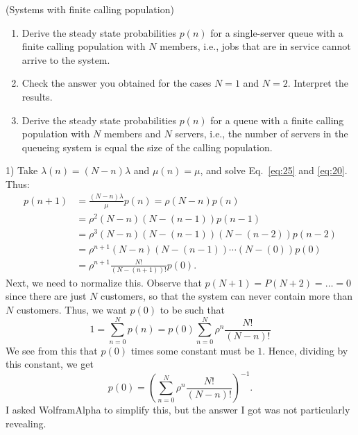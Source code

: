 \begin{question}(Systems with finite calling population)
  \begin{enumerate}
  \item Derive the steady state probabilities $p(n)$ for a
    single-server queue with a finite calling population with $N$
    members, i.e., jobs that are in service cannot arrive to the system.
  \item Check the answer you obtained for the cases $N=1$ and
    $N=2$. Interpret the results.
  \item Derive the steady state probabilities $p(n)$ for a queue with
    a finite calling population with $N$ members and $N$ servers,
    i.e., the number of servers in the queueing system is equal the
    size of the calling population.
  \end{enumerate}
  
    \begin{solution}
1) Take $\lambda(n) = (N-n)\lambda$ and $\mu(n) = \mu$, and solve
    Eq.~\eqref{eq:25} and \eqref{eq:20}.  Thus: 
    \begin{equation*}
      \begin{split}
       p(n+1) 
& = \frac{(N-n)\lambda}\mu p(n) 
 = \rho (N-n) p(n) \\
& = \rho^2 (N-n)(N-(n-1))p(n-1) \\
& = \rho^3 (N-n)(N-(n-1))(N-(n-2)) p(n-2) \\
& = \rho^{n+1} (N-n)(N-(n-1))\cdots(N-(0)) p(0) \\
&= \rho^{n+1} \frac{N!}{(N-(n+1))!}p(0). 
      \end{split}
    \end{equation*}
    Next, we need to normalize this. Observe that
    $p(N+1)=P(N+2) = \ldots = 0$ since there are just $N$ customers,
    so that the system can never contain more than $N$
    customers. Thus, we want $p(0)$ to be such that
\begin{equation*}
  1 = \sum_{n=0}^N p(n) = p(0) \sum_{n=0}^N \rho^n \frac{N!}{(N-n)!}
\end{equation*}
We see from this that $p(0)$ times some constant must be $1$. Hence, dividing by this constant, we get 
\begin{equation*}
  p(0) = \left(\sum_{n=0}^N \rho^n \frac{N!}{(N-n)!}\right)^{-1}.
\end{equation*}
I asked WolframAlpha to simplify this, but the answer I got was not particularly revealing. 


\end{solution}
\end{question}
